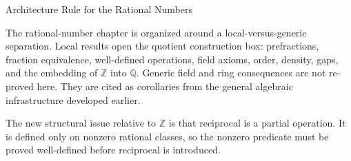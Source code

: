 \label{sec:canonical-rational-statement-plan}

\begin{topicbox}{Architecture Rule for the Rational Numbers}
\begin{exposition}
The rational-number chapter is organized around a local-versus-generic
separation. Local results open the quotient construction box: prefractions,
fraction equivalence, well-defined operations, field axioms, order, density,
gaps, and the embedding of $\mathbb{Z}$ into $\mathbb{Q}$. Generic field and
ring consequences are not re-proved here. They are cited as corollaries from
the general algebraic infrastructure developed earlier.
\end{exposition}

\begin{remark*}
The new structural issue relative to $\mathbb{Z}$ is that reciprocal is a
partial operation. It is defined only on nonzero rational classes, so the
nonzero predicate must be proved well-defined before reciprocal is introduced.
\end{remark*}
\end{topicbox}

